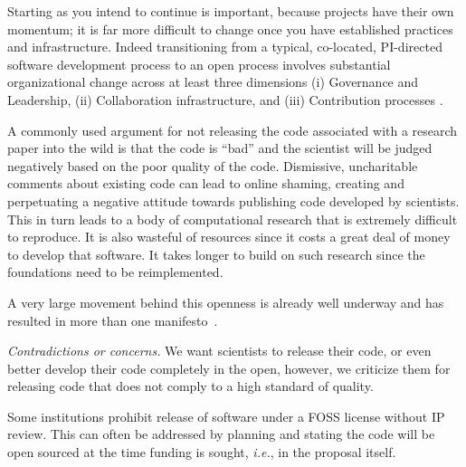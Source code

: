 \documentclass[a4paper,UKenglish]{dagman}
\newcommand{\ie}{\emph{i.e.},\xspace}
\begin{document}
Starting as you intend to continue is important, because projects have their own momentum; it is far more difficult to change once you have established practices and infrastructure. Indeed transitioning from a typical, co-located, PI-directed software development process to an open process involves substantial organizational change across at least three dimensions (i) Governance and Leadership, (ii) Collaboration infrastructure, and (iii) Contribution processes \cite{howison2014collaboration}.

A commonly used argument for not releasing the code associated with a research paper into the wild is that the code is ``bad'' and the scientist will be judged negatively based on the poor quality of the code.
Dismissive, uncharitable comments about existing code can lead to online shaming, creating and perpetuating a negative attitude towards publishing code developed by scientists.
This in turn leads to a body of computational research that is extremely difficult to reproduce. It is also wasteful of resources since it costs a great deal of money to develop that software. It takes longer to build on such research since the foundations need to be reimplemented.

A very large movement behind this openness is already well underway and has resulted in more than one manifesto~\cite{barba_reproducibility_2012,alex_holcombe_open_2011}.

\emph{Contradictions or concerns.}
We want scientists to release their code, or even better develop their code completely in the open, however, we criticize them for releasing code that does not comply to a high standard of quality. 

Some institutions prohibit release of software under a FOSS license without IP review. This can often be addressed by planning and stating the code will be open sourced at the time funding is sought, \ie in the proposal itself.
\end{document}
